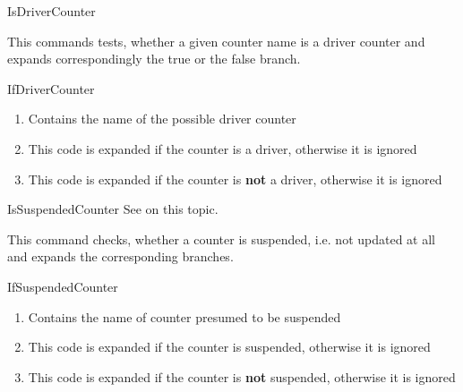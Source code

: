 \documentclass[12pt,paper=a4]{article}
\begin{document}
\begin{docCommand}{IsDriverCounter}{}%

This commands tests, whether a given counter name is a driver counter and expands correspondingly the true or the false branch.

\begin{docCommandArgs}{IfDriverCounter}%

\begin{enumerate}[label={\textcolor{blue}{\#\arabic*}}]
\item {}%

  Contains the name of the possible driver counter

\item {}

  This code is expanded if the counter is a driver, otherwise it is ignored

\item {}

  This code is expanded if the counter is \textbf{not} a  driver, otherwise it is ignored
\end{enumerate}
\end{docCommandArgs}


\begin{dispExample}
\end{dispExample}

\end{docCommand}%

\begin{docCommand}{IsSuspendedCounter}{}
See  on this topic. 

This command checks, whether a counter is suspended, i.e. not updated at all and expands the corresponding branches.

\begin{docCommandArgs}{IfSuspendedCounter}%

\begin{enumerate}[label={\textcolor{blue}{\#\arabic*}}]
\item {}%

  Contains the name of counter presumed to be suspended

\item {}

  This code is expanded if the counter is suspended, otherwise it is ignored

\item {}

  This code is expanded if the counter is \textbf{not} suspended, otherwise it is ignored

\end{enumerate}
\end{docCommandArgs}



\end{docCommand}
\end{document}
